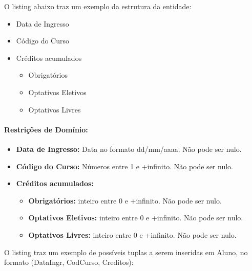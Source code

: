 \documentclass{report}
\begin{document}
  O listing abaixo traz um exemplo da estrutura da entidade:
\begin{itemize}
  \item Data de Ingresso
  \item Código do Curso
  \item Créditos acumulados
  \begin{itemize}
    \item Obrigatórios
    \item Optativos Eletivos
    \item Optativos Livres
  \end{itemize}
\end{itemize}
\paragraph{Restrições de Domínio:}
\begin{itemize}
  \item \textbf{Data de Ingresso:} Data no formato dd/mm/aaaa. Não pode ser nulo.
  \item \textbf{Código do Curso:} Números entre 1 e +infinito. Não pode ser nulo.
  \item \textbf{Créditos acumulados:}
  \begin{itemize}
    \item \textbf{Obrigatórios:} inteiro entre 0 e +infinito. Não pode ser nulo.
    \item \textbf{Optativos Eletivos:} inteiro entre 0 e +infinito. Não pode ser nulo.
    \item \textbf{Optativos Livres:} inteiro entre 0 e +infinito. Não pode ser nulo.
  \end{itemize}
\end{itemize}

O listing traz um exemplo de possíveis tuplas a serem inseridas em Aluno, no formato (DataIngr, CodCurso, Creditos):
\end{document}
